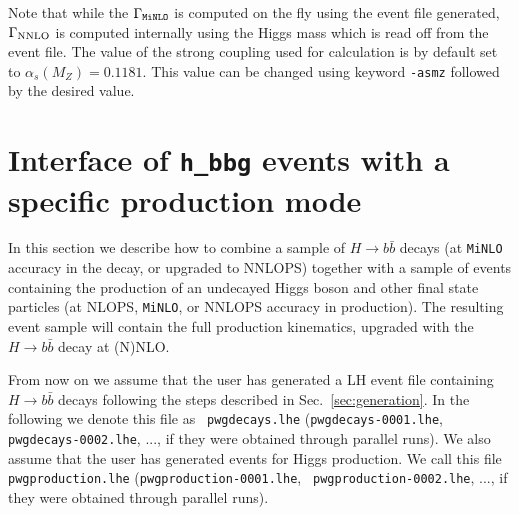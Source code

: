 \documentclass[11pt,a4paper]{article}\pdfoutput=1
\newcommand{\MINLO}{{\tt{MiNLO}}}
\newcommand{\hbbg}{{\tt{h\_bbg}}}
\newcommand{\Hbb}[1]{\ensuremath{H\to b\bar{b}{#1}}}
\begin{document}
Note that while the $\Gamma_{\MINLO{}}$ is computed on the fly using
the event file generated, $\Gamma_{\rm NNLO}$ is computed internally
using the Higgs mass which is read off from the event file. The value
of the strong coupling used for calculation is by default set to
$\alpha_s(M_Z) = 0.1181$. This value can be changed using keyword
{\tt{-asmz}} followed by the desired value.



\section{Interface of \hbbg{} events with a specific production mode}
\label{sec:interface}

In this section we describe how to combine a sample of \Hbb{} decays
(at \MINLO{} accuracy in the decay, or upgraded to NNLOPS) together
with a sample of events containing the production of an undecayed Higgs boson
and other final state particles (at NLOPS, \MINLO{}, or NNLOPS
accuracy in production).  The resulting event sample will contain the
full production kinematics, upgraded with the \Hbb{} decay at (N)NLO.

From now on we assume that the user has generated a LH event file
containing \Hbb{} decays following the steps described
in Sec.~\ref{sec:generation}. In the following we denote this file as {\tt
  pwgdecays.lhe} ({\tt pwgdecays-0001.lhe}, {\tt pwgdecays-0002.lhe},
..., if they were obtained through parallel runs). We also assume that
the user has generated events for Higgs production. We call this file
{\tt pwgproduction.lhe} ({\tt pwgproduction-0001.lhe}, {\tt
  pwgproduction-0002.lhe}, ..., if they were obtained through parallel
runs).
\end{document}
